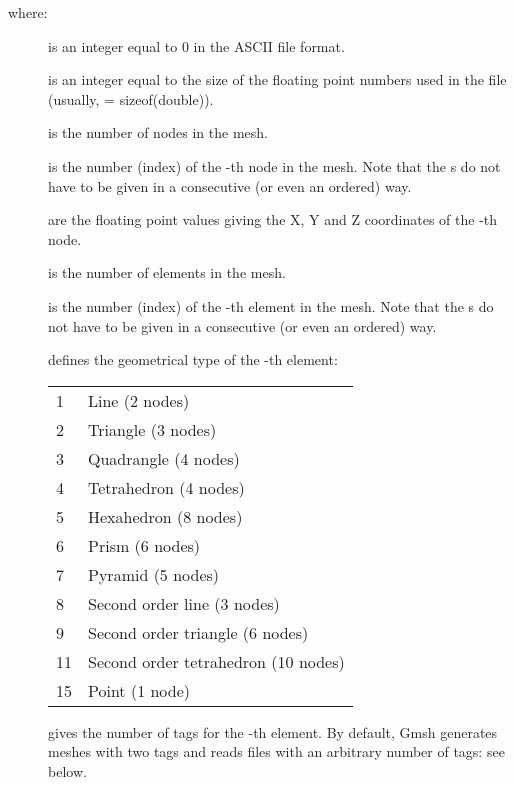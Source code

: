 where:
\begin{description}
\item[]
is an integer equal to 0 in the ASCII file format.

\item[]
is an integer equal to the size of the floating point numbers used in the
file (usually,  = sizeof(double)).

\item[]
is the number of nodes in the mesh.

\item[]
is the number (index) of the -th node in the mesh. Note that the
s do not have to be given in a consecutive (or even an
ordered) way.

\item[  ]
are the floating point values giving the X, Y and Z coordinates of the
-th node.

\item[]
is the number of elements in the mesh.

\item[]
is the number (index) of the -th element in the mesh. Note that the
s do not have to be given in a consecutive (or even an
ordered) way.

\item[]
defines the geometrical type of the -th element:

\begin{tabular}{ll}
1 & Line (2 nodes) \\
2 & Triangle (3 nodes) \\
3 & Quadrangle (4 nodes) \\
4 & Tetrahedron (4 nodes) \\
5 & Hexahedron (8 nodes) \\
6 & Prism (6 nodes) \\
7 & Pyramid (5 nodes) \\
8 & Second order line (3 nodes) \\
9 & Second order triangle (6 nodes) \\
11 & Second order tetrahedron (10 nodes) \\
15 & Point (1 node) \\
\end{tabular}

\item[]
gives the number of tags for the -th element. By default, Gmsh
generates meshes with two tags and reads files with an arbitrary number of
tags: see below.


\end{description}
